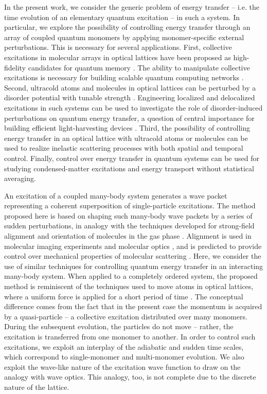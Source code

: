 In the present work, we consider the generic problem of energy transfer -- i.e. the time evolution of an elementary  
quantum excitation -- in such a system. In particular, we explore the possibility of controlling energy transfer through
 an array of coupled quantum monomers by applying monomer-specific external perturbations. This is necessary for 
several applications. First, collective excitations in molecular arrays in optical lattices have been proposed as 
high-fidelity candidates for quantum memory \cite{peter-rabl, peter-rabl2}.  The ability to manipulate collective excitations is necessary
 for building scalable quantum computing networks \cite{quantum-computing}. 
Second, ultracold atoms and 
molecules in optical lattices can be perturbed by a disorder potential with tunable strength 
\cite{anderson-localization-of-ultracold-atoms}. Engineering localized and delocalized excitations in such systems 
can be used to investigate the role of disorder-induced perturbations  on quantum energy transfer, a question of
 central importance for building efficient light-harvesting devices \cite{solar-cell}.
 Third, the possibility of controlling energy transfer in an optical lattice with ultracold atoms or molecules can
 be used to realize inelastic scattering processes with both spatial and temporal control. Finally, control over energy
transfer in quantum systems can be used for studying condensed-matter excitations and energy transport without 
statistical averaging.

An excitation of a coupled many-body system generates a wave packet representing a coherent superposition of 
single-particle excitations. The method proposed here is based on shaping such many-body wave packets by a series
 of sudden perturbations, in analogy with the techniques developed for strong-field alignment and orientation of 
molecules in the gas phase \cite{alignment-review}. Alignment is used in molecular imaging experiments and
 molecular optics \cite{alignment-review, imaging1, imaging2, imaging3}, and is predicted to provide control over 
mechanical properties of molecular scattering \cite{averbukh-AlignedInteractions, averbukh-AlignedInteractions2}. 
Here, we consider the use of similar techniques for controlling quantum energy transfer in an  interacting
 many-body system.
 When applied to a completely ordered system, the proposed method is reminiscent of the techniques used to 
move atoms in optical lattices, where a uniform force is applied for a short period of time \cite{denschlag2002}. 
The conceptual difference comes from the fact that in the present case the momentum is acquired by a 
quasi-particle -- a collective excitation distributed over many monomers. During the subsequent evolution, 
the particles do not move -- rather, the excitation is transferred from one monomer to another. In order to control
 such excitations, we exploit an interplay of the adiabatic and sudden time scales, which correspond to
 single-monomer and multi-monomer evolution. We also exploit the wave-like nature of the excitation wave function
 to draw on the analogy with wave optics. This analogy, too, is not complete due to the discrete nature of the lattice.

